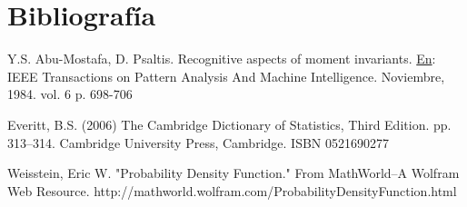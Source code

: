 \documentclass[a4paper, 11pt, oneside]{report}
\begin{document}

\chapter*{Bibliografía}
	
	Y.S. Abu-Mostafa, D. Psaltis. Recognitive aspects of moment invariants. \underline{En}: IEEE Transactions on Pattern Analysis And Machine Intelligence. Noviembre, 1984. vol. 6 p. 698-706



	Everitt, B.S. (2006) The Cambridge Dictionary of Statistics, Third Edition. pp. 313–314. Cambridge University Press, Cambridge. ISBN 0521690277

	Weisstein, Eric W. "Probability Density Function." From MathWorld--A Wolfram Web Resource. http://mathworld.wolfram.com/ProbabilityDensityFunction.html
\end{document}

